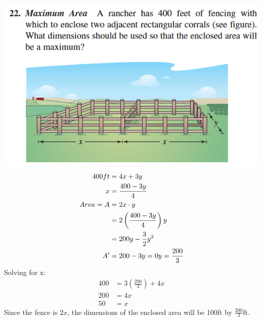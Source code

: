 \documentclass[11pt]{article}
\newcommand*{\vs}{\vspace{1cm}}
\newcommand*{\next}{\noindent}
\newcommand*{\set}{\setcounter{equation}{0}}
\begin{document}
\vs
\next
\includegraphics{22.png}
\begin{align}
    \set
    400ft&=4x+3y\\
    x&=\frac{400-3y}{4}\\
    Area=A&=2x\cdot y\\
    &=2\left(\frac{400-3y}{4}\right)y\\
    &=200y-\frac{3}{2}y^2\\
    A'&=200-3y=0
    y=\frac{200}{3}
\end{align}
Solving for x:
\begin{align}
    400&=3\left(\frac{200}{3}\right)+4x\\
    200&=4x\\
    50&=x
\end{align}
Since the fence is $2x$, the dimensions of the enclosed area will be 100ft by $\frac{200}{3}$ft.
\end{document}
